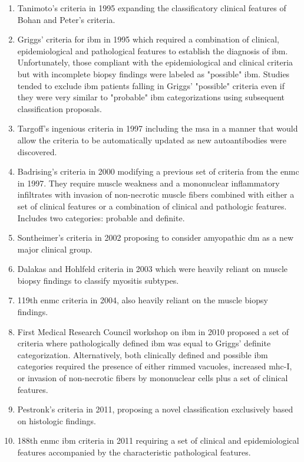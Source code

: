 \begin{enumerate}
	\item Tanimoto's criteria in 1995\cite{Tanimoto1995} expanding the classificatory clinical features of Bohan and Peter's criteria.
	
	\item Griggs' criteria for \gls{ibm} in 1995\cite{Griggs1995} which required a combination of clinical, epidemiological and pathological features to establish the diagnosis of \gls{ibm}. Unfortunately, those compliant with the epidemiological and clinical criteria but with incomplete biopsy findings were labeled as "possible" \gls{ibm}. Studies tended to exclude \gls{ibm} patients falling in Griggs' "possible" criteria even if they were very similar to "probable" \gls{ibm} categorizations using subsequent classification proposals.
	
	\item Targoff's ingenious criteria in 1997\cite{Targoff1997} including the \gls{msa} in a manner that would allow the criteria to be automatically updated as new autoantibodies were discovered.
	
	\item Badrising's criteria in 2000\cite{Badrising2000} modifying a previous set of criteria from the \Gls{enmc} in 1997.\cite{Emery1997} They require muscle weakness and a mononuclear inflammatory infiltrates with invasion of non-necrotic muscle fibers combined with either a set of clinical features or a combination of clinical and pathologic features. Includes two categories: probable and definite.
	
	\item Sontheimer's criteria in 2002\cite{Sontheimer2002} proposing to consider amyopathic \gls{dm} as a new major clinical group.
	
	\item Dalakas and Hohlfeld criteria in 2003\cite{Dalakas2003} which were heavily reliant on muscle biopsy findings to classify myositis subtypes.
	
	\item 119th \Gls{enmc} criteria in 2004,\cite{Hoogendijk2004} also heavily reliant on the muscle biopsy findings.
	
	\item First Medical Research Council workshop on \gls{ibm} in 2010\cite{HiltonJones2010} proposed a set of criteria where pathologically defined \gls{ibm} was equal to Griggs' definite categorization. Alternatively, both clinically defined and possible \gls{ibm} categories required the presence of either rimmed vacuoles, increased \gls{mhc}-I, or invasion of non-necrotic fibers by mononuclear cells plus a set of clinical features.
	
	\item Pestronk's criteria in 2011,\cite{Pestronk2011} proposing a novel classification exclusively based on histologic findings.
	
	\item 188th \Gls{enmc} \gls{ibm} criteria in 2011\cite{Rose2013} requiring a set of clinical and epidemiological features accompanied by the characteristic pathological features.
\end{enumerate}

